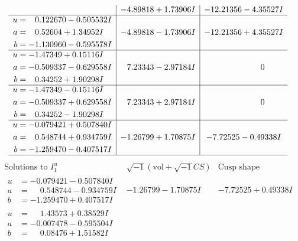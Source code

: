 \documentclass[1p]{elsarticle_modified}
\theoremstyle{definition}
\newcommand{\I}{\sqrt{-1}}
\begin{document}
$$\begin{array}{c|c|c}
 & -4.89818 + 1.73906 I & -12.21356 - 4.35527 I \\ \hline\begin{aligned}
u &= \phantom{-}0.122670 - 0.505532 I \\
a &= \phantom{-}0.52604 + 1.34952 I \\
b &= -1.130960 - 0.595578 I\end{aligned}
 & -4.89818 - 1.73906 I & -12.21356 + 4.35527 I \\ \hline\begin{aligned}
u &= -1.47349 + 0.15116 I \\
a &= -0.509337 - 0.629558 I \\
b &= \phantom{-}0.34252 + 1.90298 I\end{aligned}
 & \phantom{-}7.23343 - 2.97184 I & \phantom{-0.000000 } 0 \\ \hline\begin{aligned}
u &= -1.47349 - 0.15116 I \\
a &= -0.509337 + 0.629558 I \\
b &= \phantom{-}0.34252 - 1.90298 I\end{aligned}
 & \phantom{-}7.23343 + 2.97184 I & \phantom{-0.000000 } 0 \\ \hline\begin{aligned}
u &= -0.079421 + 0.507840 I \\
a &= \phantom{-}0.548744 + 0.934759 I \\
b &= -1.259470 - 0.407517 I\end{aligned}
 & -1.26799 + 1.70875 I & -7.72525 - 0.49338 I\\
 \hline 
 \end{array}$$\newpage$$\begin{array}{c|c|c}  
\text{Solutions to }I^u_{1}& \I (\text{vol} + \sqrt{-1}CS) & \text{Cusp shape}\\
 \hline 
\begin{aligned}
u &= -0.079421 - 0.507840 I \\
a &= \phantom{-}0.548744 - 0.934759 I \\
b &= -1.259470 + 0.407517 I\end{aligned}
 & -1.26799 - 1.70875 I & -7.72525 + 0.49338 I \\ \hline\begin{aligned}
u &= \phantom{-}1.43573 + 0.38529 I \\
a &= -0.007478 - 0.595504 I \\
b &= \phantom{-}0.08476 + 1.51582 I\end{aligned}

\end{array}$$
\end{document}
